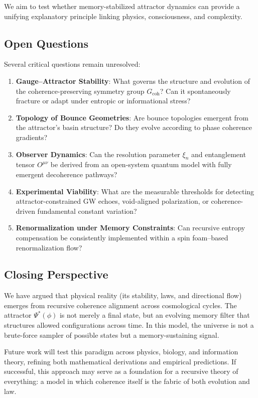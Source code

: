 We aim to test whether memory-stabilized attractor dynamics can provide a unifying explanatory principle linking physics, consciousness, and complexity.

\subsection{Open Questions}

Several critical questions remain unresolved:

\begin{enumerate}
  \item \textbf{Gauge–Attractor Stability}: What governs the structure and evolution of the coherence-preserving symmetry group \( G_{\text{coh}} \)? Can it spontaneously fracture or adapt under entropic or informational stress?
  \item \textbf{Topology of Bounce Geometries}: Are bounce topologies emergent from the attractor’s basin structure? Do they evolve according to phase coherence gradients?
  \item \textbf{Observer Dynamics}: Can the resolution parameter \( \xi_n \) and entanglement tensor \( O^{\mu\nu} \) be derived from an open-system quantum model with fully emergent decoherence pathways?
  \item \textbf{Experimental Viability}: What are the measurable thresholds for detecting attractor-constrained GW echoes, void-aligned polarization, or coherence-driven fundamental constant variation?
  \item \textbf{Renormalization under Memory Constraints}: Can recursive entropy compensation be consistently implemented within a spin foam–based renormalization flow?
\end{enumerate}

\subsection{Closing Perspective}

We have argued that physical reality (its stability, laws, and directional flow) emerges from recursive coherence alignment across cosmological cycles. The attractor \( \Psi^*(\phi) \) is not merely a final state, but an evolving memory filter that structures allowed configurations across time. In this model, the universe is not a brute-force sampler of possible states but a memory-sustaining signal.

Future work will test this paradigm across physics, biology, and information theory, refining both mathematical derivations and empirical predictions. If successful, this approach may serve as a foundation for a recursive theory of everything: a model in which coherence itself is the fabric of both evolution and law.
